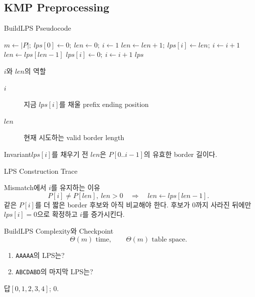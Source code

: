 \subsection{KMP Preprocessing}
\begin{frame}{BuildLPS Pseudocode}
\algofont\begin{algorithmic}[1]
\State \(m\gets|P|;\ lps[0]\gets0;\ len\gets0;\ i\gets1\)
\State \(len\gets len+1;\ lps[i]\gets len;\ i\gets i+1\)
\State \(len\gets lps[len-1]\)
\Else\State \(lps[i]\gets0;\ i\gets i+1\)\EndIf
\EndWhile\State\Return \(lps\)\EndProcedure
\end{algorithmic}
\end{frame}
\begin{frame}{\(i\)와 \(len\)의 역할}
\begin{description}
\item[\(i\)]지금 \(lps[i]\)를 채울 prefix ending position
\item[\(len\)]현재 시도하는 valid border length
\end{description}
\begin{block}{Invariant}\(lps[i]\)를 채우기 전 \(len\)은 \(P[0..i-1]\)의 유효한 border 길이다.\end{block}
\end{frame}
\begin{frame}{LPS Construction Trace}
\centering{}
\end{frame}
\begin{frame}{Mismatch에서 \(i\)를 유지하는 이유}
\[
P[i]\ne P[len],\ len>0
\quad\Rightarrow\quad
len\gets lps[len-1].
\]
같은 \(P[i]\)를 더 짧은 border 후보와 아직 비교해야 한다. 후보가 0까지 사라진 뒤에만 \(lps[i]=0\)으로 확정하고 \(i\)를 증가시킨다.
\end{frame}
\begin{frame}{BuildLPS Complexity와 Checkpoint}
\[
\Theta(m)\text{ time},\qquad\Theta(m)\text{ table space}.
\]
\begin{enumerate}\item \texttt{AAAAA}의 LPS는?\item \texttt{ABCDABD}의 마지막 LPS는?\end{enumerate}
\begin{exampleblock}{답}\([0,1,2,3,4]\); 0.\end{exampleblock}
\end{frame}
